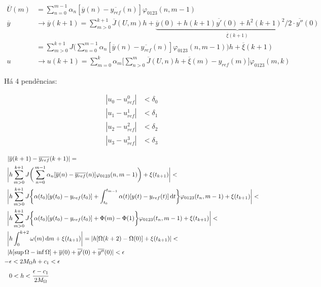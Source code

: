 \documentclass[12pt]{article}
\begin{document}
\begin{align}
\overline{U}(m) &= \sum_{n = 0}^{m - 1} \alpha_n [\overline{y}(n) - \overline{y_{ref}}(n)] \varphi_{0123} (n, m-1) \\
\overline{y} &\to \overline{y}(k+ 1) = \sum_{m > 0}^{k+1} \overline{J}(U,m) h + \underbrace{\overline{y}(0) + h(k+1) \overline{y'}(0) + h^2(k+1)^2/2\cdot \overline{y''}(0)}_{\overline{\xi}(k+1)}  \\
&= \sum_{m > 0}^{k+1} J\bigg( \sum_{n = 0}^{m - 1} \alpha_n [\overline{y}(n) - \overline{y_{ref}}(n)] \varphi_{0123} (n, m-1) \bigg) h + \overline{\xi}(k+1) \\
u &\to u(k + 1) = \sum_{m = 0}^k \alpha_m \bigg[\sum_{n > 0}^m \overline{J}(U,n) h + \overline{\xi}(m) - y_{ref}(m)\bigg] \varphi_{0123} (m, k)
\end{align}

H\'a 4 pend\^encias:

\begin{align}
|u_0 - u_{ref}^0| &< \delta_0 \\
|u_1 - u_{ref}^1| &< \delta_1 \\
|u_2 - u_{ref}^2| &< \delta_2 \\
|u_3 - u_{ref}^3| &< \delta_3
\end{align}


\begin{align}
  |&\overline{y}(k+1) - \overline{y_{ref}}(k+1)| = \\
\bigg| &h \sum_{m > 0}^{k+1} J\bigg( \sum_{n = 0}^{m - 1} \alpha_n [\overline{y}(n) - \overline{y_{ref}}(n)] \varphi_{0123} (n, m-1) \bigg)  + \xi(t_{k+1})\bigg| < \\
\bigg| &h \sum_{m > 0}^{k+1} J \bigg\{ \alpha(t_0) [y(t_0) - y_{ref}(t_0)] + \int_{t_0}^{t_{m - 1}} \alpha(t) [y(t) - y_{ref}(t)]\,\mathrm{d}t \bigg\} \varphi_{0123} (t_n, m-1)  + \xi(t_{k+1}) \bigg| < \\
\bigg| &h \sum_{m > 0}^{k+1} J \bigg\{ \alpha(t_0) [y(t_0) - y_{ref}(t_0)] + \Phi(m) - \Phi(1) \bigg\} \varphi_{0123} (t_n, m-1)  + \xi(t_{k+1}) \bigg| < \\
\bigg| &h \int_{0}^{k+2} \omega(m)\,\mathrm{d}m + \xi(t_{k+1}) \bigg| = | h[\Omega(k+2) - \Omega(0)] + \xi(t_{k+1}) | < \\
| &h[\sup \Omega - \inf \Omega ] + \overline{y}(0) + \overline{y'}(0) +  \overline{y''}(0) | < \epsilon \\
- &\epsilon < 2 M_{\Omega} h + c_1 < \epsilon \\
&0 < h < \cfrac{\epsilon - c_1}{2 M_{\Omega}}
\end{align}
\end{document}
